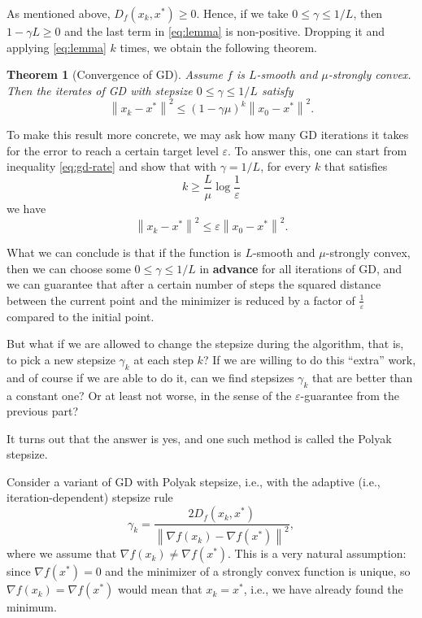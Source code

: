 \documentclass[11pt]{article}
\newtheorem{theorem}{Theorem}
\newcommand{\norm}[1]{\left\| #1 \right\|}
\begin{document}
As mentioned above, $D_f(x_k, x^*) \geq 0$. Hence, if we take $0 \leq \gamma \leq 1/L$,
then $1 - \gamma L \geq 0$ and the last term in \eqref{eq:lemma} is non-positive.
Dropping it and applying \eqref{eq:lemma} $k$ times, we obtain the following theorem.

\begin{theorem}[Convergence of GD]\label{thm:gd}
Assume $f$ is $L$-smooth and $\mu$-strongly convex. Then the iterates of GD
with stepsize $0 \leq \gamma \leq 1/L$ satisfy
\begin{equation}\label{eq:gd-rate}
\norm{x_k-x^*}^2 \leq (1-\gamma\mu)^k\norm{x_0-x^*}^2.
\end{equation}
\end{theorem}

To make this result more concrete,
we may ask how many GD iterations it takes for the error to reach
a certain target level $\varepsilon$. To answer this, one can start from inequality
\eqref{eq:gd-rate} and show that with $\gamma = 1/L$, for every $k$ that satisfies
\[
k \geq \frac{L}{\mu}\log\frac{1}{\varepsilon}
\]
we have
\[
\norm{x_k-x^*}^2 \leq \varepsilon\norm{x_0-x^*}^2.
\]

What we can conclude is that if the function is $L$-smooth and
$\mu$-strongly convex, then we can choose some $0 \leq \gamma \leq 1/L$ in \textbf{advance}
for all iterations of GD, and we can guarantee that after a certain number of steps
the squared distance between the current point and the minimizer is reduced by a factor
of $\frac{1}{\varepsilon}$ compared to the initial point.

But what if we are allowed to change the stepsize during the algorithm,
that is, to pick a new stepsize $\gamma_k$ at each step $k$?
If we are willing to do this ``extra'' work, and of course if we are able to do it,
can we find stepsizes $\gamma_k$ that are better than a constant one? Or at least not worse, in the sense of the $\varepsilon$-guarantee
from the previous part?

It turns out that the answer is yes, and one such method is called the Polyak stepsize.

Consider a variant of GD with Polyak stepsize, i.e., with the adaptive (i.e.,
iteration-dependent) stepsize rule
\[
\gamma_k = \frac{2D_f(x_k,x^*)}{\norm{\nabla f(x_k) - \nabla f(x^*)}^2},
\]
where we assume that $\nabla f(x_k) \neq \nabla f(x^*)$. This is a very natural assumption:
since $\nabla f(x^*) = 0$ and the minimizer of a strongly convex function is unique, so
$\nabla f(x_k) = \nabla f(x^*)$ would mean that $x_k = x^*$, i.e., we have already found the minimum.
\end{document}
